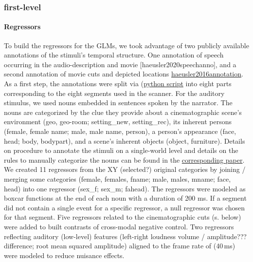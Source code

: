 \documentclass[english]{article}
\begin{document}
\subsubsection{first-level}
\paragraph{Regressors }
To build the regressors for the GLMs, we took advantage of two publicly available annotations of the stimuli's temporal structure.
One annotation of speech occurring in the audio-description and movie [haeusler2020speechanno], and a second annotation of movie cuts and depicted locations \href{https://f1000research.com/articles/5-2273}{haeusler2016annotation}.
As a first step, the annotations were split via (\href{"https://github.com/chrhaeusler/studyforrest-data-annotations/blob/master/code/researchcut2segments.py"}{python script} into eight parts corresponding to the eight segments used in the scanner.
For the auditory stimulus, we used nouns embedded in sentences spoken by the narrator. The nouns are categorized by the clue they provide about a cinematographic scene's environment  (geo, geo-room; setting\_new, setting\_rec), its inherent persons (female, female name; male, male name, person), a person's appearance (face, head; body, bodypart), and a scene's inherent objects (object, furniture).
Details on procedure to annotate the stimuli on a single-world level and details on the rules to manually categorize the nouns can be found in the \href{"https://www.overleaf.com/project/5d4ab1b759001b5db6ea2bc3"}{corresponding paper}.
We created 11 regressors from the XY (selected?) original categories by joining / merging some categories (female, females, fname; male, males, mname; face, head) into one regressor (sex\_f; sex\_m; fahead).
The regressors were modeled as boxcar functions at the end of each noun with a duration of 200 ms.
If a segment did not contain a single event for a specific regressor, a null regressor was chosen for that segment.
Five regressors related to the cinematographic cuts (s. below) were added to built contrasts of cross-modal negative control.
Two regressors reflecting auditory (low-level) features (left-right loudness volume / amplitude??? difference; root mean squared amplitude) aligned to the frame rate of (40\,ms) were modeled to reduce nuisance effects.
\end{document}
